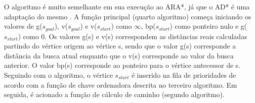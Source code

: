 
O algoritmo é muito semelhante em sua execução ao ARA*, já que o AD* é uma adaptação do mesmo \cite{moura2010estudo}. A função principal (quarto algoritmo) começa iniciando os valores de g($s_{goal}$), v($s_{goal}$) e v($s_{start}$) como $\infty$, bp($s_{start}$) como ponteiro nulo e g($s_{start}$) como 0. Os valores g(s) e v(s) correspondem as distâncias reais calculadas partindo do vértice origem ao vértice s, sendo que o valor g(s) corresponde a distância da busca atual enquanto que o v(s) corresponde ao valor da busca anterior. O valor bp(s) corresponde ao ponteiro para o vértice antecessor de s. Seguindo com o algoritmo, o vértice $s_{start}$ é inserido na fila de prioridades de acordo com  a função de chave ordenadora descrita no terceiro algoritmo. Em seguida, é acionado a função de cálculo de caminho (segundo algoritmo).

